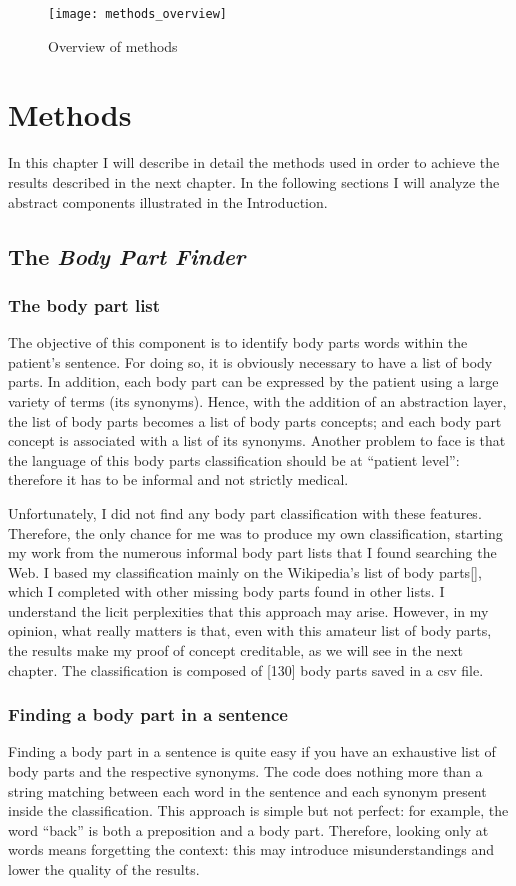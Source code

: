\begin{figure}[h]
\centering
\texttt{[image: methods\_overview]}
\caption{Overview of methods}
\medskip
\end{figure}

\newpage
\chapter{Methods}
\label{cha:methods}
In this chapter I will describe in detail the methods used in order to achieve the results described in the next chapter. In the following sections I will analyze the abstract components illustrated in the Introduction.

\section{The \textit{Body Part Finder}}
\label{sec:body_part_finder}
\subsection{The body part list}
The objective of this component is to identify body parts words within the patient's sentence. For doing so, it is obviously necessary to have a list of body parts. In addition, each body part can be expressed by the patient using a large variety of terms (its synonyms). Hence, with the addition of an abstraction layer, the list of body parts becomes a list of body parts concepts; and each body part concept is associated with a list of its synonyms. Another problem to face is that the language of this body parts classification should be at “patient level”: therefore it has to be informal and not strictly medical.

Unfortunately, I did not find any body part classification with these features. Therefore, the only chance for me was to produce my own classification, starting my work from the numerous informal body part lists that I found searching the Web. I based my classification mainly on the Wikipedia's list of body parts[], which I completed with other missing body parts found in other lists. I understand the licit perplexities that this approach may arise. However, in my opinion, what really matters is that, even with this amateur list of body parts, the results make my proof of concept creditable, as we will see in the next chapter. The classification is composed of [130] body parts saved in a csv file.

\subsection{Finding a body part in a sentence}
Finding a body part in a sentence is quite easy if you have an exhaustive list of body parts and the respective synonyms. The code does nothing more than a string matching between each word in the sentence and each synonym present inside the classification. This approach is simple but not perfect: for example, the word “back” is both a preposition and a body part. Therefore, looking only at words means forgetting the context: this may introduce misunderstandings and lower the quality of the results.

